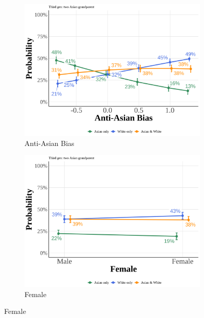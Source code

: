 \pagebreak
\newpage

\begin{center}
\begin{figure}[!htb]
\centering
\caption{Predicted Probabilities: Third Generation Two Asian Grandparents}
\label{fig:pp-third-two}

\begin{subfigure}{.48\textwidth}
\caption{Anti-Asian Bias}
\centering
\includegraphics[width=1\linewidth]{simple_pp_value_third_two.png}
\end{subfigure}
\hfill
\begin{subfigure}{.48\textwidth}
\caption{Female}
\centering
\includegraphics[width=1\linewidth]{simple_pp_Female_third_two.png}
\end{subfigure}


\end{figure}
\end{center}
